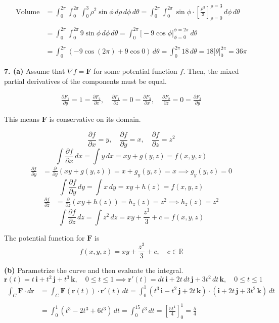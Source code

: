 \documentclass{article}
\begin{document}
\begin{align*}
\text{Volume}&=\int_0^{2\pi}\int_0^{2\pi}\int_0^{3}\rho^2\sin\phi\,d\rho\,d\phi\,d\theta=\int_0^{2\pi}\int_0^{2\pi}\sin\phi\cdot\left[\frac{\rho^3}3\right]_{\rho=0}^{\rho=3}\,d\phi\,d\theta\\\\&=\int_0^{2\pi}\int_0^{2\pi}9\sin\phi\,d\phi\,d\theta=\int_0^{2\pi}\bigg[-9\cos\phi\bigg]_{\phi=0}^{\phi=2\pi}\,d\theta\\\\&=\int_0^{2\pi}\left(-9\cos(2\pi)+9\cos0\right)\,d\theta=\int_0^{2\pi}18\,d\theta=18\bigg[\theta\bigg]_0^{2\pi}=\boxed{36\pi}
\end{align*}

\vspace{1em}

\textbf{7. (a)} Assume that $\nabla f=\mathbf{F}$ for some potential function $f$. Then, the mixed partial derivatives of the components must be equal.

\[
\begin{array}{c}
\displaystyle\frac{\partial{F}_1}{\partial y}=1=\frac{\partial{F}_2}{\partial x},\quad\frac{\partial{F}_1}{\partial z}=0=\frac{\partial{F}_3}{\partial x},\quad\frac{\partial{F}_2}{\partial z}=0=\frac{\partial{F}_3}{\partial y}
\end{array}
\]

This means $\mathbf{F}$ is conservative on its domain.

\[\frac{\partial f}{\partial x}=y,\quad\frac{\partial f}{\partial y}=x,\quad\frac{\partial f}{\partial z}=z^2\]
\[\int\frac{\partial f}{\partial x}\,dx=\int y\,dx=xy+g(y,z)=f(x,y,z)\]
\begin{align*}\frac{\partial f}{\partial y}&=\frac{\partial}{\partial y}\left(xy+g(y,z)\right)=x+g_y(y,z)=x\implies g_y(y,z)=0\end{align*}
\[\int\frac{\partial f}{\partial y}\,dy=\int x\,dy=xy+h(z)=f(x,y,z)\]
\begin{align*}\frac{\partial f}{\partial z}&=\frac{\partial}{\partial z}\left(xy+h(z)\right)=h_z(z)=z^2\implies h_z(z)=z^2\end{align*}
\[\int\frac{\partial f}{\partial z}\,dz=\int z^2\,dz=xy+\frac{z^3}3+c=f(x,y,z)\]

The potential function for $\mathbf{F}$ is
\[\boxed{f(x,y,z)=xy+\frac{z^3}3+c,\quad c\in\mathbb{R}}\]

\textbf{(b)} Parametrize the curve and then evaluate the integral.
\[\mathbf{r}(t)=t\,\mathbf{i}+t^2\,\mathbf{j}+t^3\,\mathbf{k},\quad0\leq t\leq1\implies\mathbf{r}'(t)=dt\,\mathbf{i}+2t\,dt\,\mathbf{j}+3t^2\,dt\,\mathbf{k},\quad0\leq t\leq1\]
\begin{align*}\int_C\mathbf{F}\cdot d\mathbf{r}&=\int_C\mathbf{F}(\mathbf{r}(t))\cdot\mathbf{r}'(t)\,dt=\int_0^1\left(t^3\,\mathbf{i}-t^2\,\mathbf{j}+2t\,\mathbf{k}\right)\cdot(\mathbf{i}+2t\,\mathbf{j}+3t^2\,\mathbf{k})\,dt\\\\&=\int_0^1\left(t^3-2t^3+6t^3\right)\,dt=\int_0^15t^3\,dt=\left[\frac{5t^4}4\right]_0^1=\boxed{\frac54}\end{align*}
\end{document}
